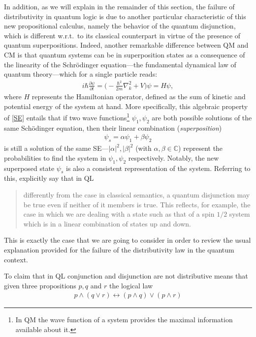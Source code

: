 \documentclass[11pt, executivepaper]{article}
\begin{document}
In addition, as we will explain in the remainder of this section, the failure of distributivity in quantum logic is due to another particular characteristic of this new propositional calculus, namely the behavior of the quantum disjunction, which is different w.r.t.\ to its classical counterpart in virtue of the presence of quantum superpositions. Indeed, another remarkable difference between QM  and CM is that quantum systems can be in superposition states as a consequence of the linearity of the Schr\"odinger equation---the fundamental dynamical law of quantum theory---which for a single particle reads: 
\begin{align}
\label{SE}
i\hbar\frac{\partial\psi}{\partial t}=\Big(-\frac{\hbar^2}{2m}\nabla_k^2+V\Big)\psi=H\psi,
\end{align}
\noindent where $H$ represents the Hamiltonian operator, defined as the sum of kinetic and potential energy of the system at hand. More specifically, this algebraic property of \eqref{SE} entails that if two wave functions\footnote{In QM the wave function of a system provides the maximal information available about it.} $\psi_1, \psi_2$ are both possible solutions of the same Sch\"odinger equation, then their linear combination (\emph{superposition}) 
\begin{align}
\psi_s=\alpha\psi_{1}+\beta\psi_{2} \nonumber
\end{align} 
is still a solution of the same SE---$|\alpha|^2,|\beta|^2$ (with $\alpha,\beta\in\mathbb{C}$) represent the probabilities to find the system in $\psi_1, \psi_2$ respectively. Notably, the new superposed state $\psi_s$ is also a consistent representation of the system. Referring to this,  \cite{deRonde:2016} explicitly say that in QL 
\begin{quote}
differently from the case in classical semantics, a quantum disjunction may be true even if neither of it members is true. This reflects, for example, the case in which we are dealing with a state such as that of a spin $1/2$ system which is in a linear combination of states up and down.
\end{quote}
\noindent This is exactly the case that we are going to consider in order to review the usual explanation provided for the failure of the distributivity law in the quantum context. 

To claim that in QL conjunction and disjunction are not distributive means that given three propositions $p, q$ and $r$ the logical law
\begin{align}
\label{DL}
p\wedge(q\vee r)\longleftrightarrow(p\wedge q)\vee(p\wedge r)
\end{align}
\end{document}
